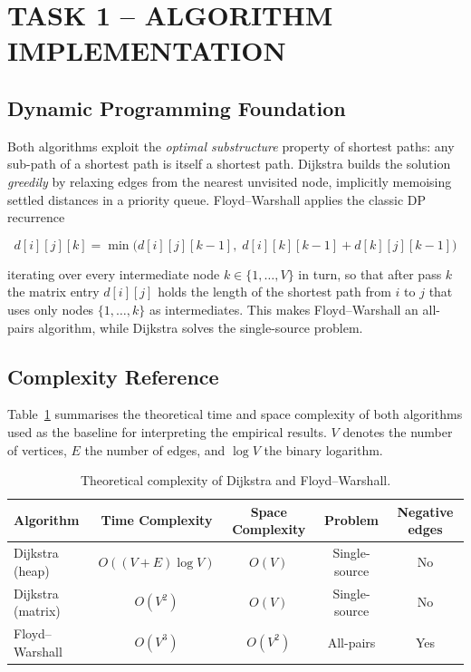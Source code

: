 \documentclass[12pt,a4paper]{article}
\begin{document}
	\section{TASK 1 -- ALGORITHM IMPLEMENTATION}
	
	\subsection{Dynamic Programming Foundation}
	
	Both algorithms exploit the \emph{optimal substructure} property of shortest
	paths: any sub-path of a shortest path is itself a shortest path. Dijkstra builds
	the solution \emph{greedily} by relaxing edges from the nearest unvisited node,
	implicitly memoising settled distances in a priority queue. Floyd--Warshall
	applies the classic DP recurrence
	
	\[
	d[i][j][k] = \min\!\bigl(d[i][j][k-1],\;d[i][k][k-1]+d[k][j][k-1]\bigr)
	\]
	
	\noindent iterating over every intermediate node $k \in \{1,\ldots,V\}$ in
	turn, so that after pass $k$ the matrix entry $d[i][j]$ holds the length of the
	shortest path from $i$ to $j$ that uses only nodes $\{1,\ldots,k\}$ as
	intermediates. This makes Floyd--Warshall an all-pairs algorithm, while
	Dijkstra solves the single-source problem.
	
	\subsection{Complexity Reference}
	
	Table~\ref{tab:complexity} summarises the theoretical time and space complexity
	of both algorithms used as the baseline for interpreting the empirical results.
	$V$ denotes the number of vertices, $E$ the number of edges, and
	$\log V$ the binary logarithm.
	
	\begin{table}[h!]
		\centering
		\caption{Theoretical complexity of Dijkstra and Floyd--Warshall.}
		\label{tab:complexity}
		\renewcommand{\arraystretch}{1.3}
		\begin{tabular}{lcccc}
			\toprule
			\textbf{Algorithm} & \textbf{Time Complexity} & \textbf{Space Complexity} & \textbf{Problem} & \textbf{Negative edges} \\
			\midrule
			Dijkstra (heap)        & $O((V+E)\log V)$ & $O(V)$     & Single-source & No  \\
			Dijkstra (matrix)      & $O(V^2)$         & $O(V)$     & Single-source & No  \\
			Floyd--Warshall        & $O(V^3)$         & $O(V^2)$   & All-pairs     & Yes \\
			\bottomrule
		\end{tabular}
	\end{table}
	
\end{document}
